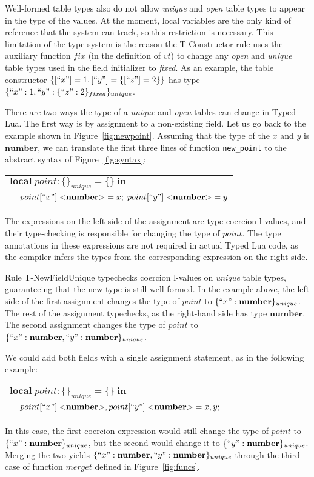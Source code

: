 \documentclass[10pt]{sigplanconf}
\newcommand{\Number}{\mathbf{number}}
\begin{document}
Well-formed table types also do not allow \emph{unique} and
\emph{open} table types to appear in the type of the values.
At the moment, local variables are the only kind of reference that the system
can track, so this restriction is
necessary. This limitation of the type system is the reason the {\sc T-Constructor} rule uses the auxiliary function $fix$
(in the definition of $vt$)
 to change any {\em open} and {\em unique} table types used in the field initializer to {\em fixed}. As an example, the table constructor $\{[``x"] = 1, [``y"] = \{[``z"] = 2\}\}$
has type $\{``x":1, ``y":\{``z":2\}_{fixed}\}_{unique}$.

There are two ways the type of a {\em unique} and {\em open} tables can change in Typed
Lua. The first way is by assignment to a non-existing
field. Let us go back to the example shown in Figure~\ref{fig:newpoint}. Assuming that the type of the
$x$ and $y$ is $\Number$, we can translate the first three lines
of function {\tt new\_point} to the abstract syntax of Figure~\ref{fig:syntax}:
{\footnotesize
\begin{center}
\begin{tabular}{ll}
\multicolumn{2}{l}{$\mathbf{local} \; point: \{\}_{unique} = \{\} \; \mathbf{in}$}\\
& \multicolumn{1}{l}{$point[``x"] \; {<}\Number{>} = x;\;
point[``y"] \; {<}\Number{>} = y$}
\end{tabular}
\end{center}
}

The expressions on the left-side of the assignment are type
coercion l-values, and their type-checking is responsible
for changing the type of $point$. The type annotations in
these expressions are not
required in actual Typed Lua code, as the compiler infers the types from the corresponding expression on the right side.

Rule {\sc T-NewFieldUnique} typechecks coercion l-values on
{\em unique} table types, guaranteeing that the new type
is still well-formed. In the example above, the left
side of the first assignment changes the type of $point$
to $\{``x":\Number\}_{unique}$. The rest of the assignment
typechecks, as the right-hand side has type $\Number$.
The second assignment changes the type of $point$ to
$\{``x":\Number, ``y": \Number\}_{unique}$.

We could add both fields with a single assignment statement,
as in the following example:
{\footnotesize
\begin{center}
	\begin{tabular}{ll}
		\multicolumn{2}{l}{$\mathbf{local} \; point: \{\}_{unique} = \{\} \; \mathbf{in}$}\\
		& \multicolumn{1}{l}{$point[``x"] \; {<}\Number{>},point[``y"] \; {<}\Number{>} = x,y;$}
	\end{tabular}
\end{center}
}
In this case, the first coercion expression would still change the type of $point$ to $\{``x":\Number\}_{unique}$, but the
second would change it to $\{``y":\Number\}_{unique}$.
Merging the two yields $\{``x":\Number, ``y": \Number\}_{unique}$
through the third case of function $merget$ defined in Figure~\ref{fig:funcs}.
\end{document}
